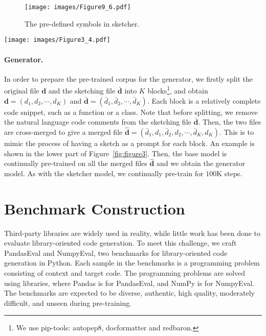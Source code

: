 \documentclass{article}
\newcommand{\peval}{PandasEval\xspace}
\newcommand{\neval}{NumpyEval\xspace}
\newcommand{\pandas}{Pandas\xspace}
\newcommand{\numpy}{NumPy\xspace}
\begin{document}
\begin{figure}[t]
    \small
    \centering
    \texttt{[image: images/Figure9\_6.pdf]}
\caption{The pre-defined symbols in sketcher.}
    \label{fig:figure8}
\end{figure}

\begin{figure*}[t]
    \small
    \centering
    \texttt{[image: images/Figure3\_4.pdf]}
\caption{Training data preparation for sketcher and generator with an example in \pandas.}
    \label{fig:figure3}
\end{figure*}

\paragraph{Generator.}
In order to prepare the pre-trained corpus for the generator, we firstly split the original file $\mathbf{d}$ and the sketching file $\bar{\mathbf{d}}$ into $K$ blocks\footnote{We use pip-tools: autopep8, docformatter and redbaron.}, and obtain $\mathbf{d}=(d_1,d_2,{\cdots},d_K)$ and $\bar{\mathbf{d}}=(\bar{d}_1,\bar{d}_2,{\cdots},\bar{d}_K)$. Each block is a relatively complete code snippet, such as a function or a class. Note that before splitting, we remove the natural language code comments from the sketching file $\bar{\mathbf{d}}$. Then, the two files are cross-merged to give a merged file $\hat{\mathbf{d}}=(\bar{d}_1, d_1,\bar{d}_2,d_2,{\cdots},\bar{d}_K,d_K)$. This is to mimic the process of having a sketch as a prompt for each block. An example is shown in the lower part of Figure~\ref{fig:figure3}. Then, the base model is continually pre-trained on all the merged files $\hat{\mathbf{d}}$ and we obtain the generator model. As with the sketcher model, we continually pre-train for $100$K steps.

\section{Benchmark Construction} \label{pandasevalandnumpyevaldatasets}

Third-party libraries are widely used in reality, while little work has been done to evaluate library-oriented code generation. To meet this challenge, we craft \peval and \neval, two benchmarks for library-oriented code generation in Python. Each sample in the benchmarks is a programming problem consisting of context and target code. The programming problems are solved using libraries, where \pandas is for \peval, and \numpy is for \neval. The benchmarks are expected to be diverse, authentic, high quality, moderately difficult, and unseen during pre-training.
\end{document}
